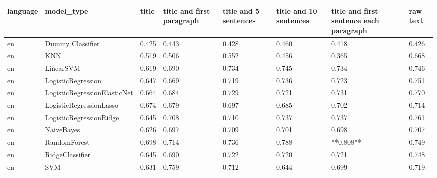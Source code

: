 \begin{tabular}{llllllll}
\toprule
language &                   model\_type & title & title and first paragraph & title and 5 sentences & title and 10 sentences & title and first sentence each paragraph &  raw text \\
\midrule
      en &             Dummy Classifier & 0.425 &                     0.443 &                 0.428 &                  0.460 &                                   0.418 &     0.426 \\
      en &                          KNN & 0.519 &                     0.506 &                 0.552 &                  0.456 &                                   0.365 &     0.668 \\
      en &                    LinearSVM & 0.619 &                     0.690 &                 0.734 &                  0.745 &                                   0.734 &     0.746 \\
      en &           LogisticRegression & 0.647 &                     0.669 &                 0.719 &                  0.736 &                                   0.723 &     0.751 \\
      en & LogisticRegressionElasticNet & 0.664 &                     0.684 &                 0.729 &                  0.721 &                                   0.731 &     0.770 \\
      en &      LogisticRegressionLasso & 0.674 &                     0.679 &                 0.697 &                  0.685 &                                   0.702 &     0.714 \\
      en &      LogisticRegressionRidge & 0.645 &                     0.708 &                 0.710 &                  0.737 &                                   0.737 &     0.761 \\
      en &                   NaiveBayes & 0.626 &                     0.697 &                 0.709 &                  0.701 &                                   0.698 &     0.707 \\
      en &                 RandomForest & 0.698 &                     0.714 &                 0.736 &                  0.788 &                               **0.808** &     0.749 \\
      en &              RidgeClassifier & 0.645 &                     0.690 &                 0.722 &                  0.720 &                                   0.721 &     0.748 \\
      en &                          SVM & 0.631 &                     0.759 &                 0.712 &                  0.644 &                                   0.699 &     0.719 \\

\end{tabular}
